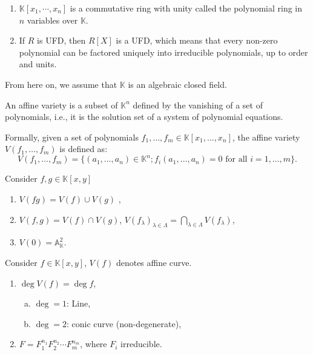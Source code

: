 \documentclass[10pt]{article}
\begin{document}
\begin{proposition}
  \begin{enumerate}[(1)]
    \item   $ \mathbb{K}[x_1,\cdots ,x_{n}]$ is a commutative ring with unity called the polynomial ring in $ n$ variables over $ \mathbb{K}$.
    \item If $ R$ is UFD, then $ R[X]$ is a UFD, which means that every non-zero polynomial can be factored uniquely into irreducible polynomials, up to order and units.
  \end{enumerate}
\end{proposition}

From here on, we assume that $ \mathbb{K}$ is an algebraic closed field.
\begin{definition}
  An affine variety is a subset of $ \mathbb{K}^{n}$ defined by the vanishing of a set of polynomials, i.e., it is the solution set of a system of polynomial equations.

  Formally, given a set of polynomials $ f_1, \ldots, f_m \in \mathbb{K}[x_1,\ldots,x_n]$, the affine variety $ V(f_1, \ldots, f_m)$ is defined as:
  \begin{equation*}
    V(f_1, \ldots, f_m) = \{ (a_1, \ldots, a_n) \in \mathbb{K}^{n} ; f_i(a_1, \ldots, a_n) = 0 \text{ for all } i = 1, \ldots, m \}.
  \end{equation*}
\end{definition}

\begin{proposition}
  Consider $ f, g \in \mathbb{K}[x,y]$
  \begin{enumerate}[(1)]
    \item $V(fg) = V(f) \cup V(g)$ ,
    \item $ V(f, g) = V(f) \cap V(g)$, $ V(f_{\lambda})_{\lambda \in \Lambda} = \bigcap_{\lambda \in \Lambda} V(f_{\lambda})$,
    \item $ V(0) = \mathbb{A}_{\mathbb{K}}^{2}$.
  \end{enumerate}
\end{proposition}

\begin{definition}
  Consider $ f \in \mathbb{K}[x,y]$, $ V(f)$ denotes affine curve.
  \begin{enumerate}[(1)]
    \item $ \deg V(f) = \deg f$,
      \begin{enumerate}[(a)]
        \item $\deg = 1$: Line,
        \item $\deg = 2$: conic curve (non-degenerate),
      \end{enumerate}
    \item $ F = F_{1}^{n_1} F_2^{n_2} \cdots F_{m}^{n_{m}}$, where $ F_{i}$ irreducible.
  \end{enumerate}
\end{definition}
\end{document}
